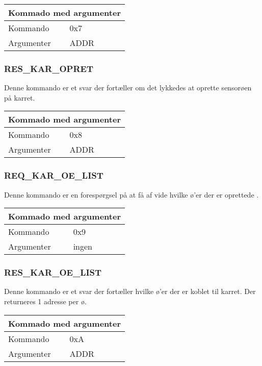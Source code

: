 \begin{table}[H]
\setlength{\parindent}{12pt}
\begin{tabular}{|l|lcc|}
\hline
\multicolumn{4}{|c|}{Kommado med argumenter}\\\hline
Kommando & 0x7 & & \\
Argumenter & ADDR & & \\\hline
\end{tabular}
\end{table}


\subsubsection{RES\_KAR\_OPRET}
Denne kommando er et svar der fortæller om det lykkedes at oprette sensorøen på karret.

\begin{table}[H]
\setlength{\parindent}{12pt}
\begin{tabular}{|l|lcc|}
\hline
\multicolumn{4}{|c|}{Kommado med argumenter}\\\hline
Kommando & 0x8 & & \\
Argumenter & ADDR & & \\\hline
\end{tabular}
\end{table}


\subsubsection{REQ\_KAR\_OE\_LIST}
Denne kommando er en forespørgsel på at få af vide hvilke ø'er der er oprettede .

\begin{table}[H]
\setlength{\parindent}{12pt}
\begin{tabular}{|l|lcc|}
\hline
\multicolumn{4}{|c|}{Kommado med argumenter}\\\hline
Kommando & 0x9 & & \\
Argumenter & ingen & & \\\hline
\end{tabular}
\end{table}


\subsubsection{RES\_KAR\_OE\_LIST}
Denne kommando er et svar der fortæller hvilke ø'er der er koblet til karret. Der returneres 1 adresse per ø.

\begin{table}[H]
\setlength{\parindent}{12pt}
\begin{tabular}{|l|lcc|}
\hline
\multicolumn{4}{|c|}{Kommado med argumenter}\\\hline
Kommando & 0xA & & \\
Argumenter & ADDR & & \\\hline
\end{tabular}
\end{table}

